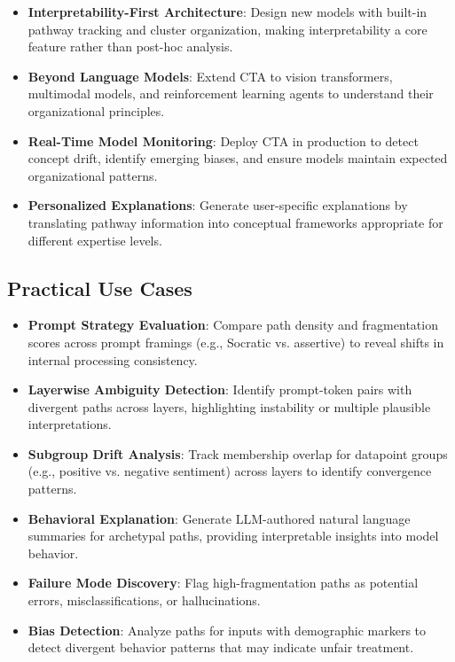 \begin{itemize}
    \item \textbf{Interpretability-First Architecture}: Design new models with built-in pathway tracking and cluster organization, making interpretability a core feature rather than post-hoc analysis.
    
    \item \textbf{Beyond Language Models}: Extend CTA to vision transformers, multimodal models, and reinforcement learning agents to understand their organizational principles.
    
    \item \textbf{Real-Time Model Monitoring}: Deploy CTA in production to detect concept drift, identify emerging biases, and ensure models maintain expected organizational patterns.
    
    \item \textbf{Personalized Explanations}: Generate user-specific explanations by translating pathway information into conceptual frameworks appropriate for different expertise levels.
\end{itemize}

\subsection{Practical Use Cases}

\begin{itemize}
    \item \textbf{Prompt Strategy Evaluation}: Compare path density and fragmentation scores across prompt framings (e.g., Socratic vs. assertive) to reveal shifts in internal processing consistency.
    
    \item \textbf{Layerwise Ambiguity Detection}: Identify prompt-token pairs with divergent paths across layers, highlighting instability or multiple plausible interpretations.
    
    \item \textbf{Subgroup Drift Analysis}: Track membership overlap for datapoint groups (e.g., positive vs. negative sentiment) across layers to identify convergence patterns.
    
    \item \textbf{Behavioral Explanation}: Generate LLM-authored natural language summaries for archetypal paths, providing interpretable insights into model behavior.
    
    \item \textbf{Failure Mode Discovery}: Flag high-fragmentation paths as potential errors, misclassifications, or hallucinations.
    
    \item \textbf{Bias Detection}: Analyze paths for inputs with demographic markers to detect divergent behavior patterns that may indicate unfair treatment.
\end{itemize}

